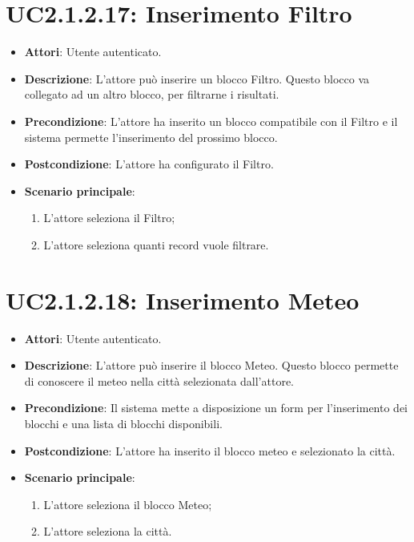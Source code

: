 \section{UC2.1.2.17: Inserimento Filtro}
\label{UC2.1.2.17}
\begin{itemize}
	\item \textbf{Attori}: Utente autenticato.
	\item \textbf{Descrizione}: L'attore può inserire un blocco Filtro. Questo blocco va collegato ad un altro blocco, per filtrarne i risultati. 
	\item \textbf{Precondizione}: L'attore ha inserito un blocco compatibile con il Filtro e il sistema permette l'inserimento del prossimo blocco.
	\item \textbf{Postcondizione}: L'attore ha configurato il Filtro. 
	\item \textbf{Scenario principale}:
	\begin{enumerate} \item L'attore seleziona il Filtro;  \item  L'attore seleziona quanti record vuole filtrare.\end{enumerate}
\end{itemize}

\section{UC2.1.2.18: Inserimento Meteo}
\label{UC2.1.2.18}
\begin{itemize}
	\item \textbf{Attori}: Utente autenticato.
	\item \textbf{Descrizione}: L'attore può inserire il blocco Meteo. Questo blocco permette di conoscere il meteo nella città selezionata dall'attore.
	\item \textbf{Precondizione}: Il sistema mette a disposizione un form per l'inserimento dei blocchi e una lista di blocchi disponibili.	
	\item \textbf{Postcondizione}: L'attore ha inserito il blocco meteo e selezionato la città.
	\item \textbf{Scenario principale}:
	\begin{enumerate} \item L'attore seleziona il blocco Meteo;  \item  L'attore seleziona la città.\end{enumerate}
\end{itemize}

